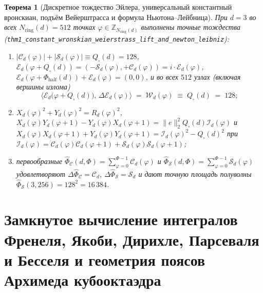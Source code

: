 \documentclass[11pt,a4paper]{article}
\theoremstyle{plain}
\newtheorem{theorem}{Теорема}[section]
\theoremstyle{definition}
\begin{document}
\begin{theorem}[Дискретное тождество Эйлера, универсальный константный вронскиан, подъём Вейерштрасса и формула Ньютона--Лейбница]
\label{thm:main-1}
При $d=3$ во всех $N_{\mathrm{ring}}(d)=512$ точках $\varphi\in\mathbb{Z}_{N_{\mathrm{ring}}(d)}$ выполнены точные тождества (\texttt{thm1\_constant\_wronskian\_weierstrass\_lift\_and\_newton\_leibniz}):
\begin{enumerate}[label=\textbf{(\roman*)},leftmargin=*]
\item $|\mathcal{C}_d(\varphi)| + |\mathcal{S}_d(\varphi)| \equiv Q_\square(d) = 128$, $\mathcal{E}_d(\varphi + Q_\square(d)) = (-\mathcal{S}_d(\varphi), +\mathcal{C}_d(\varphi)) = i\cdot\mathcal{E}_d(\varphi)$, $\mathcal{E}_d(\varphi + \Phi_{\mathrm{half}}(d)) + \mathcal{E}_d(\varphi) = (0,0)$, и во всех $512$ узлах (включая вершины излома)
  \[
    \bigl\langle \mathcal{E}_d\bigl(\varphi+Q_\square(d)\bigr),\,\Delta\mathcal{E}_d(\varphi)\bigr\rangle \;=\; \mathcal{W}_d(\varphi) \;\equiv\; Q_\square(d) \;=\; 128;
  \]
\item $X_d(\varphi)^2 + Y_d(\varphi)^2 = R_d(\varphi)^2$, $X_d(\varphi)Y_d(\varphi+1) - Y_d(\varphi)X_d(\varphi+1) = \|e\|_2^2 Q_\square(d)\mathcal{I}_d(\varphi)$ и $X_d(\varphi)X_d(\varphi+1) + Y_d(\varphi)Y_d(\varphi+1) = \mathcal{I}_d(\varphi)^2 - Q_\square(d)^2$ при $\mathcal{I}_d(\varphi) = \mathcal{C}_d(\varphi)\mathcal{C}_d(\varphi+1) + \mathcal{S}_d(\varphi)\mathcal{S}_d(\varphi+1)$;
\item первообразные $\widehat{\Phi}_{\mathcal{C}}(d,\Phi) = \sum_{\varphi=0}^{\Phi-1}\mathcal{C}_d(\varphi)$ и $\widehat{\Phi}_{\mathcal{S}}(d,\Phi) = \sum_{\varphi=0}^{\Phi-1}\mathcal{S}_d(\varphi)$ удовлетворяют $\Delta\widehat{\Phi}_{\mathcal{C}} = \mathcal{C}_d$, $\Delta\widehat{\Phi}_{\mathcal{S}} = \mathcal{S}_d$ и дают точную площадь полуволны $\widehat{\Phi}_{\mathcal{S}}(3,256) = 128^2 = 16\,384$.
\end{enumerate}
\end{theorem}

\section{Замкнутое вычисление интегралов Френеля, Якоби, Дирихле, Парсеваля и Бесселя и геометрия поясов Архимеда кубооктаэдра}
\label{sec:integrals-archimedes}
\end{document}

